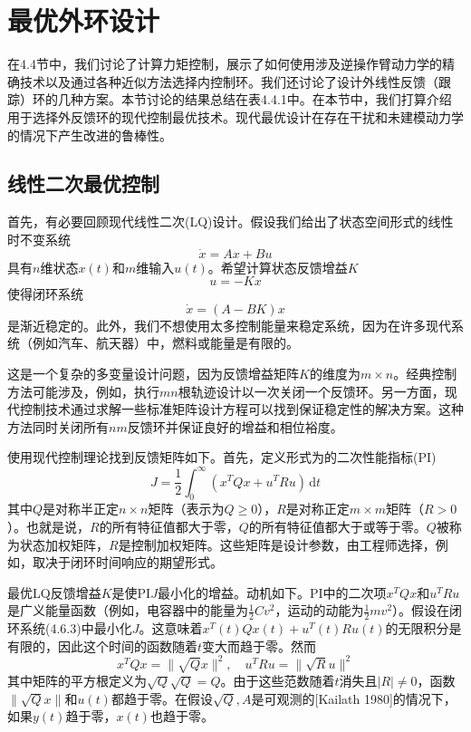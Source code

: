 \documentclass[UTF8]{ctexart}
\theoremstyle{definition}
\newcommand{\dd}{\mathrm{d}}
\begin{document}
\section{最优外环设计}

在4.4节中，我们讨论了计算力矩控制，展示了如何使用涉及逆操作臂动力学的精确技术以及通过各种近似方法选择内控制环。我们还讨论了设计外线性反馈（跟踪）环的几种方案。本节讨论的结果总结在表4.4.1中。在本节中，我们打算介绍用于选择外反馈环的现代控制最优技术。现代最优设计在存在干扰和未建模动力学的情况下产生改进的鲁棒性。

\subsection{线性二次最优控制}

首先，有必要回顾现代线性二次(LQ)设计。假设我们给出了状态空间形式的线性时不变系统
\begin{equation}
    \dot{x} = Ax + Bu
\end{equation}
具有$n$维状态$x(t)$和$m$维输入$u(t)$。希望计算状态反馈增益$K$
\begin{equation}
    u = -Kx
\end{equation}
使得闭环系统
\begin{equation}
    \dot{x} = (A - BK)x
\end{equation}
是渐近稳定的。此外，我们不想使用太多控制能量来稳定系统，因为在许多现代系统（例如汽车、航天器）中，燃料或能量是有限的。

这是一个复杂的多变量设计问题，因为反馈增益矩阵$K$的维度为$m \times n$。经典控制方法可能涉及，例如，执行$mn$根轨迹设计以一次关闭一个反馈环。另一方面，现代控制技术通过求解一些标准矩阵设计方程可以找到保证稳定性的解决方案。这种方法同时关闭所有$nm$反馈环并保证良好的增益和相位裕度。

使用现代控制理论找到反馈矩阵如下。首先，定义形式为的二次性能指标(PI)
\begin{equation}
    J = \frac{1}{2}\int_0^\infty (x^TQx + u^TRu)\,\dd t
\end{equation}
其中$Q$是对称半正定$n \times n$矩阵（表示为$Q \geq 0$），$R$是对称正定$m \times m$矩阵（$R > 0$）。也就是说，$R$的所有特征值都大于零，$Q$的所有特征值都大于或等于零。$Q$被称为状态加权矩阵，$R$是控制加权矩阵。这些矩阵是设计参数，由工程师选择，例如，取决于闭环时间响应的期望形式。

最优LQ反馈增益$K$是使PI$J$最小化的增益。动机如下。PI中的二次项$x^TQx$和$u^TRu$是广义能量函数（例如，电容器中的能量为$\frac{1}{2}Cv^2$，运动的动能为$\frac{1}{2}mv^2$）。假设在闭环系统(4.6.3)中最小化$J$。这意味着$x^T(t)Qx(t) + u^T(t)Ru(t)$的无限积分是有限的，因此这个时间的函数随着$t$变大而趋于零。然而
\begin{equation}
    x^TQx = \|\sqrt{Q}x\|^2, \quad u^TRu = \|\sqrt{R}u\|^2
\end{equation}
其中矩阵的平方根定义为$\sqrt{Q}\sqrt{Q} = Q$。由于这些范数随着$t$消失且$|R| \neq 0$，函数$\|\sqrt{Q}x\|$和$u(t)$都趋于零。在假设$\sqrt{Q}, A$是可观测的[Kailath 1980]的情况下，如果$y(t)$趋于零，$x(t)$也趋于零。
\end{document}
